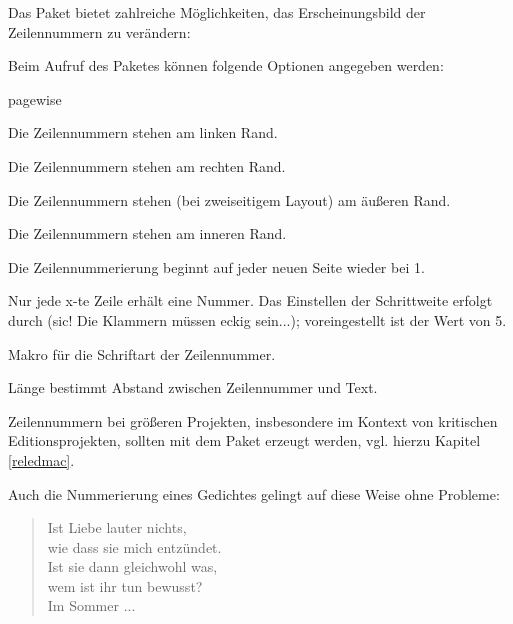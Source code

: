 
Das Paket bietet zahlreiche Möglichkeiten, das Erscheinungsbild der Zeilennummern zu 
verändern:

Beim Aufruf des Paketes können folgende Optionen angegeben werden:

\begin{labeling}{pagewise}
 \item[left] Die Zeilennummern stehen am linken Rand.
 \item[right] Die Zeilennummern stehen am rechten Rand.
 \item[switch] Die Zeilennummern stehen (bei zweiseitigem Layout) am äußeren Rand.
 \item[switch*] Die Zeilennummern stehen am inneren Rand.
 \item[pagewise] Die Zeilennummerierung beginnt auf jeder neuen Seite wieder bei 1.
 \item[modulo] Nur jede x-te Zeile erhält eine Nummer. 
  Das Einstellen der Schrittweite erfolgt durch  
  (sic! Die Klammern müssen eckig sein...);
  voreingestellt ist der Wert von 5.
\end{labeling}

Makro  für die Schriftart der Zeilennummer.

Länge  bestimmt Abstand zwischen Zeilennummer und Text.

Zeilennummern bei größeren Projekten, insbesondere im Kontext von kritischen Editionsprojekten,
sollten mit dem Paket  erzeugt werden, vgl. hierzu Kapitel \ref{reledmac}.

 


Auch die Nummerierung eines Gedichtes gelingt auf diese Weise ohne Probleme:

\begin{lfgwexample}{}
 \begin{verse}
  \modulolinenumbers[5]
  \linenumbers
  Ist Liebe lauter nichts,\\
  wie dass sie mich entzündet.\\
  Ist sie dann gleichwohl was,\\
  wem ist ihr tun bewusst?\\
  
  Im Sommer ...\\
 \end{verse}

\end{lfgwexample}



